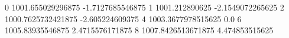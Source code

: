 0 1001.655029296875 -1.7127685546875
1 1001.212890625 -2.1549072265625
2 1000.7625732421875 -2.605224609375
4 1003.3677978515625 0.0
6 1005.83935546875 2.4715576171875
8 1007.8426513671875 4.474853515625
